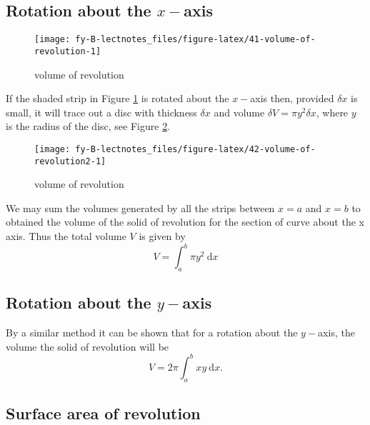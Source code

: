 \documentclass[
  11pt,
  oneside]{book}
\newcommand{\slide}{}
\theoremstyle{definition}
\theoremstyle{definition}
\theoremstyle{definition}
\theoremstyle{definition}
\theoremstyle{remark}
\begin{document}
\slide

\subsection{\texorpdfstring{Rotation about the \(x-\)axis}{Rotation about the x-axis}}\label{rotation-about-the-x-axis}

\begin{figure}

{\centering \texttt{[image: fy-B-lectnotes\_files/figure-latex/41-volume-of-revolution-1]} 

}

\caption{volume of revolution}\label{fig:41-volume-of-revolution}
\end{figure}

If the shaded strip in Figure \ref{fig:41-volume-of-revolution} is rotated about the \(x-\)axis then, provided \(\delta x\) is small, it will trace out a disc with thickness \(\delta x\) and volume \(\delta V = \pi y^2\delta x\), where \(y\) is the radius of the disc, see Figure \ref{fig:42-volume-of-revolution2}.
\slide

\begin{figure}

{\centering \texttt{[image: fy-B-lectnotes\_files/figure-latex/42-volume-of-revolution2-1]} 

}

\caption{volume of revolution}\label{fig:42-volume-of-revolution2}
\end{figure}

We may sum the volumes generated by all the strips between \(x = a\) and \(x = b\) to obtained the volume of the solid of revolution for the section of curve about the x axis.
Thus the total volume \(V\) is given by
\[
V = \int_a^b\pi y^2\ \mathrm{d}x
\]
\slide

\subsection{\texorpdfstring{Rotation about the \(y-\)axis}{Rotation about the y-axis}}\label{rotation-about-the-y-axis}

By a similar method it can be shown that for a rotation about the \(y-\)axis, the volume the solid of revolution will be
\[
V = 2\pi\int_a^bxy\ \mathrm{d}x.
\]
\slide

\subsection{Surface area of revolution}\label{surface-area-of-revolution}
\end{document}
